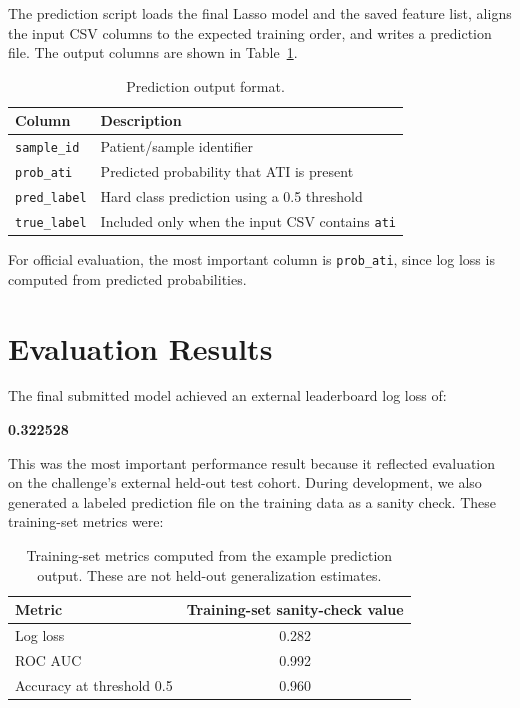\documentclass[11pt]{article}
\begin{document}
The prediction script loads the final Lasso model and the saved feature list, aligns the input CSV columns to the expected training order, and writes a prediction file. The output columns are shown in Table~\ref{tab:output}.

\begin{table}[h]
\centering
\begin{tabular}{ll}
\toprule
\textbf{Column} & \textbf{Description} \\
\midrule
\texttt{sample\_id} & Patient/sample identifier \\
\texttt{prob\_ati} & Predicted probability that ATI is present \\
\texttt{pred\_label} & Hard class prediction using a 0.5 threshold \\
\texttt{true\_label} & Included only when the input CSV contains \texttt{ati} \\
\bottomrule
\end{tabular}
\caption{Prediction output format.}
\label{tab:output}
\end{table}

For official evaluation, the most important column is \texttt{prob\_ati}, since log loss is computed from predicted probabilities.

\section{Evaluation Results}

The final submitted model achieved an external leaderboard log loss of:

\begin{center}
\Large \textbf{0.322528}
\end{center}

This was the most important performance result because it reflected evaluation on the challenge's external held-out test cohort. During development, we also generated a labeled prediction file on the training data as a sanity check. These training-set metrics were:


\begin{table}[h]
\centering
\begin{tabular}{lc}
\toprule
\textbf{Metric} & \textbf{Training-set sanity-check value} \\
\midrule
Log loss & 0.282 \\
ROC AUC & 0.992 \\
Accuracy at threshold 0.5 & 0.960 \\
\bottomrule
\end{tabular}
\caption{Training-set metrics computed from the example prediction output. These are not held-out generalization estimates.}
\label{tab:trainingmetrics}
\end{table}
\end{document}
